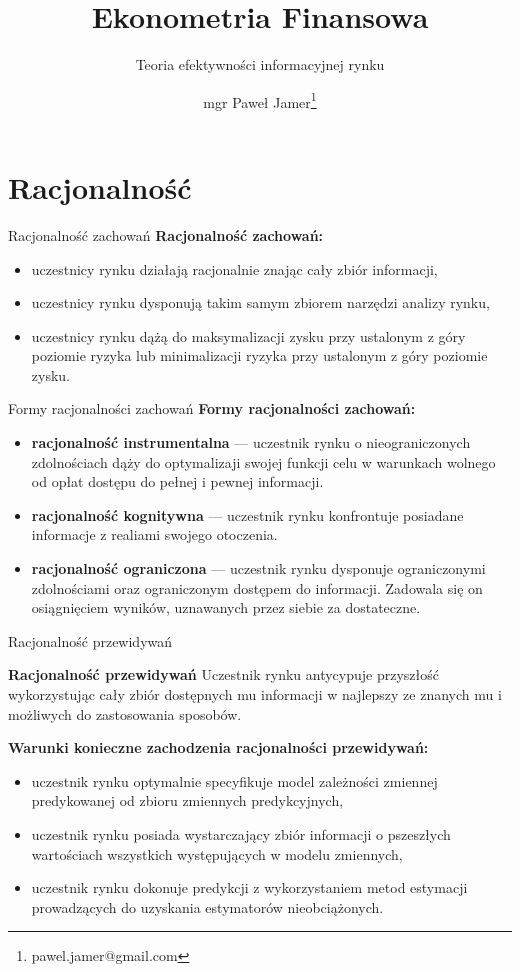 \documentclass[a4paper, 11pt]{beamer}
\title{Ekonometria Finansowa}
\subtitle{Teoria efektywności informacyjnej rynku}
\author{mgr Paweł Jamer\thanks{pawel.jamer@gmail.com}}
\begin{document}
	\begin{frame}
		\titlepage
	\end{frame}
	
	\section{Racjonalność}
	
	\begin{frame}{Racjonalność zachowań}
		\textbf{Racjonalność zachowań:}
		\begin{itemize}
			\item uczestnicy rynku działają racjonalnie znając cały zbiór informacji,
			\item uczestnicy rynku dysponują takim samym zbiorem narzędzi analizy rynku,
			\item uczestnicy rynku dążą do maksymalizacji zysku przy ustalonym z góry poziomie ryzyka
				lub minimalizacji ryzyka przy ustalonym z góry poziomie zysku.
		\end{itemize}
	\end{frame}
	
	\begin{frame}{Formy racjonalności zachowań}
		\textbf{Formy racjonalności zachowań:}
		\begin{itemize}
			\item \textbf{racjonalność instrumentalna} --- uczestnik rynku o nieograniczonych zdolnościach
				dąży do optymalizaji swojej funkcji celu w warunkach wolnego od opłat dostępu do pełnej i pewnej
				informacji.
			\item \textbf{racjonalność kognitywna} --- uczestnik rynku konfrontuje posiadane informacje z
				realiami swojego otoczenia.
			\item \textbf{racjonalność ograniczona} --- uczestnik rynku dysponuje ograniczonymi zdolnościami
				oraz ograniczonym dostępem do informacji. Zadowala się on osiągnięciem wyników, uznawanych przez
				siebie za dostateczne.
		\end{itemize}
	\end{frame}
	
	\begin{frame}{Racjonalność przewidywań}
		\begin{block}{\textbf{Racjonalność przewidywań}}
			Uczestnik rynku antycypuje przyszłość wykorzystując cały zbiór dostępnych mu informacji w najlepszy
			ze znanych mu i możliwych do zastosowania sposobów.
		\end{block}
		\textbf{Warunki konieczne zachodzenia racjonalności przewidywań:}
		\begin{itemize}
			\item uczestnik rynku optymalnie specyfikuje model zależności zmiennej predykowanej od zbioru zmiennych
				predykcyjnych,
			\item uczestnik rynku posiada wystarczający zbiór informacji o pszeszłych wartościach wszystkich
				występujących w modelu zmiennych,
			\item uczestnik rynku dokonuje predykcji z wykorzystaniem metod estymacji prowadzących do uzyskania
				estymatorów nieobciążonych.
		\end{itemize}
	\end{frame}
	
\end{document}
